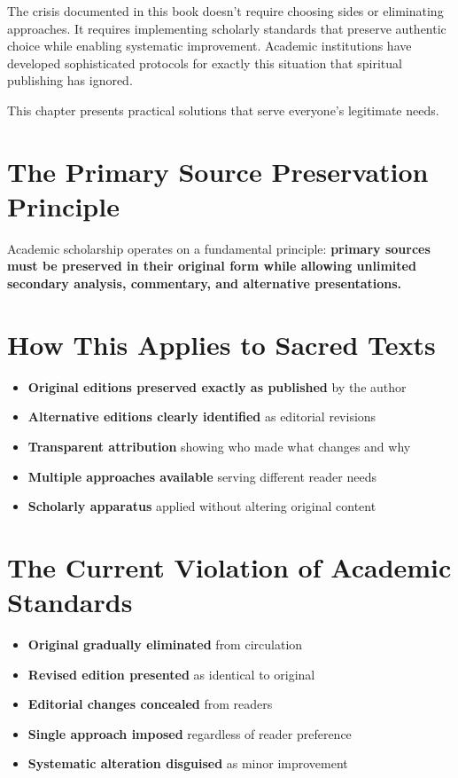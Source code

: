 \documentclass[11pt,twoside]{book}
\begin{document}
\normalfont\justifying
The crisis documented in this book doesn't require choosing sides or eliminating approaches. It requires implementing scholarly standards that preserve authentic choice while enabling systematic improvement. Academic institutions have developed sophisticated protocols for exactly this situation that spiritual publishing has ignored.

This chapter presents practical solutions that serve everyone's legitimate needs.
\section*{The Primary Source Preservation Principle}
\label{sec:orgeabc57e}

Academic scholarship operates on a fundamental principle: \textbf{\textbf{primary sources must be preserved in their original form while allowing unlimited secondary analysis, commentary, and alternative presentations.}}
\section*{How This Applies to Sacred Texts}
\label{sec:org1bd173e}
\begin{itemize}
\item \textbf{\textbf{Original editions preserved exactly as published}} by the author
\item \textbf{\textbf{Alternative editions clearly identified}} as editorial revisions
\item \textbf{\textbf{Transparent attribution}} showing who made what changes and why
\item \textbf{\textbf{Multiple approaches available}} serving different reader needs
\item \textbf{\textbf{Scholarly apparatus}} applied without altering original content
\end{itemize}
\section*{The Current Violation of Academic Standards}
\label{sec:org65e7a70}
\begin{itemize}
\item \textbf{\textbf{Original gradually eliminated}} from circulation
\item \textbf{\textbf{Revised edition presented}} as identical to original
\item \textbf{\textbf{Editorial changes concealed}} from readers
\item \textbf{\textbf{Single approach imposed}} regardless of reader preference
\item \textbf{\textbf{Systematic alteration disguised}} as minor improvement
\end{itemize}
\end{document}
